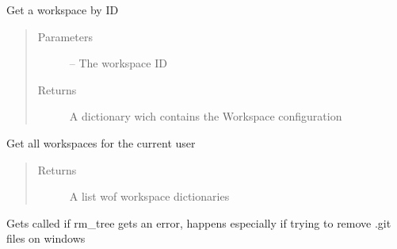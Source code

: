 \documentclass[letterpaper,10pt,english]{sphinxmanual}
\begin{document}

\begin{fulllineitems}
\label{_source/son_editor.impl:son_editor.impl.workspaceimpl.get_workspace}
Get a workspace by ID
\begin{quote}\begin{description}
\item[{Parameters}] \leavevmode
{} -- The workspace ID

\item[{Returns}] \leavevmode
A dictionary wich contains the Workspace configuration

\end{description}\end{quote}

\end{fulllineitems}


\begin{fulllineitems}
\label{_source/son_editor.impl:son_editor.impl.workspaceimpl.get_workspaces}
Get all workspaces for the current user
\begin{quote}\begin{description}
\item[{Returns}] \leavevmode
A list wof workspace dictionaries

\end{description}\end{quote}

\end{fulllineitems}


\begin{fulllineitems}
\label{_source/son_editor.impl:son_editor.impl.workspaceimpl.on_rm_error}
Gets called if rm\_tree gets an error, happens
especially if trying to remove .git files on windows

\end{fulllineitems}
\end{document}
